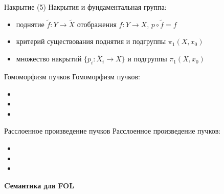 \documentclass{beamer}
\begin{document}
\begin{frame}{Накрытие (5)}
Накрытия и фундаментальная группа:\\
\medskip
\begin{itemize}
	\item поднятие $\widetilde{f} : Y \to \widetilde{X}$ отображения $f : Y \to X$, $p \circ \widetilde{f} = f$ 
	\item критерий существования поднятия и подгруппы $\pi_1(X, x_0)$
	\item множество накрытий $\{ p_i : \widetilde{X_i} \to X \}$ и подгруппы $\pi_1(X, x_0)$
\end{itemize}
\end{frame}

\begin{frame}{Гомоморфизм пучков}
Гомоморфизм пучков:\\
\medskip
\begin{itemize}
	\item 
	\item 
	\item 
\end{itemize}
\end{frame}

\begin{frame}{Расслоенное произведение пучков}
Расслоенное произведение пучков:\\
\medskip
\begin{itemize}
	\item 
	\item 
	\item 
\end{itemize}
\end{frame}


\begin{frame}{}
\begin{center}
	\textbf{Cемантика для FOL}
\end{center}
\end{frame}
\end{document}
